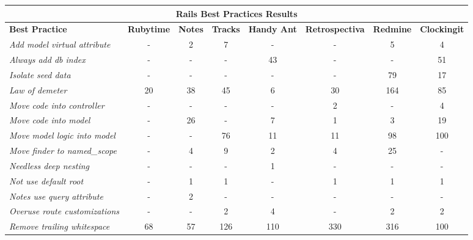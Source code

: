 \documentclass[sle]{llncs}
\begin{document}
\begin{table}[H]
\begin{center}
{\scriptsize
\begin{threeparttable}
\begin{tabular}{|l||c|c|c|c|c|c|c|} \hline 
\multicolumn{8}{|c|}{Rails Best Practices Results} \\ \hline 
\textbf{Best Practice}& \textbf{Rubytime}& \textbf{Notes}& \textbf{Tracks}&  \textbf{Handy Ant}& \textbf{Retrospectiva}& \textbf{Redmine}& \textbf{Clockingit} \\\hline\hline
\emph{\tnote{a}Add model virtual attribute           }              &   -  &   2  &   7  &   - &   - &   5 &   4  \\ \hline 
\emph{Always add db index                   }              &   -  &   -  &   -  &  43 &   - &   - &  51  \\ \hline 
\emph{Isolate seed data                     }              &   -  &   -  &   -  &   - &   - &  79 &  17  \\ \hline 
\emph{Law of demeter                        }              &  20  &  38  &  45  &   6 &  30 & 164 &  85  \\ \hline  
\emph{Move code into controller             }              &   -  &   -  &   -  &   - &   2 &   - &   4  \\ \hline 
\emph{Move code into model                  }              &   -  &  26  &   -  &   7 &   1 &   3 &  19  \\ \hline  
\emph{Move model logic into model           }              &   -  &   -  &  76  &  11 &  11 &  98 & 100  \\ \hline  
\emph{Move finder to named\_scope           }              &   -  &   4  &   9  &   2 &   4 &  25 &   -  \\ \hline  
\emph{Needless deep nesting                 }              &   -  &   -  &   -  &   1 &   - &   - &   -  \\ \hline  
\emph{Not use default root                  }              &   -  &   1  &   1  &   - &   1 &   1 &   1  \\ \hline 
\emph{Notes  use query attribute            }              &   -  &   2  &   -  &   - &   - &   - &   -  \\ \hline
\emph{Overuse route customizations          }              &   -  &   -  &   2  &   4 &   - &   2 &   2  \\ \hline   
\emph{Remove trailing whitespace            }              &  68  &  57  & 126  & 110 & 330 & 316 & 100  \\ \hline 

\end{tabular}
\end{threeparttable}}
\end{center}
\end{table}
\end{document}

